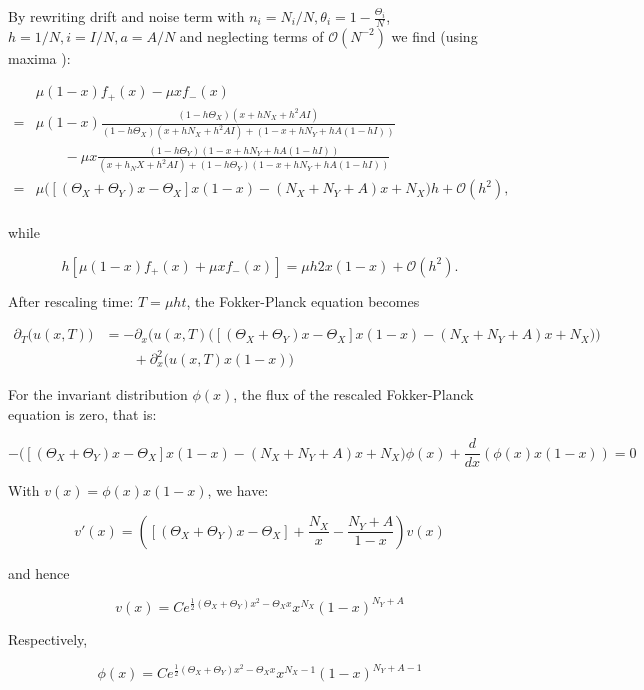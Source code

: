 By rewriting drift and noise term with $n_i = N_i/N, \theta_i = 1- \frac{\Theta_i}{N}$, $h = 1/N, i= I/N, a = A/N$ and neglecting terms of $\mathcal{O}(N^{-2})$ we find (using maxima %
):

\begin{align*}
& \mu(1-x)f_+(x) - \mu xf_-(x)\\
= & \mu(1-x) \frac{(1-h\Theta_X) (x+ hN_X+ h^2AI)}{(1-h\Theta_X) (x + hN_X + h^2AI) + (1-x + hN_Y + hA(1-hI))}\\
&\qquad - \mu x \frac{(1-h\Theta_Y)(1-x+hN_Y+hA(1-hI))}{(x+h_NX+h^2AI) + (1-h\Theta_Y)(1-x+hN_Y+hA(1-hI))}\\
=& \mu\Big(\left[\left(\Theta_X + \Theta_Y\right)x - \Theta_X\right]x\left(1-x\right)-\left(N_X + N_Y + A\right)x + N_X\Big)h+ \mathcal{O}(h^2),\\
\end{align*}

while 

\begin{equation*}
h\left[\mu(1-x)f_+(x) + \mu xf_-(x)\right] = \mu h 2x(1-x) + \mathcal{O}(h^2).
\end{equation*}

After rescaling time: $T = \mu h t$, the Fokker-Planck equation becomes

\begin{align*}
\partial_T \big(u\left(x, T\right)\big) &= -\partial_x\Bigg(u(x,T)\Big(\left[\left(\Theta_X + \Theta_Y\right)x - \Theta_X\right]x\left(1-x\right)-\left(N_X + N_Y + A\right)x + N_X\Big)\Bigg)\\
&\qquad + \partial^2_x\big(u(x,T)x(1-x)\big)
\end{align*}

For the invariant distribution $\phi(x)$, the flux of the rescaled Fokker-Planck equation is zero, that is:

\begin{equation*}
-\Big(\left[\left(\Theta_X + \Theta_Y\right)x - \Theta_X\right]x\left(1-x\right)-\left(N_X + N_Y + A\right)x + N_X\Big)\phi(x) + \frac{d}{dx}\left(\phi(x)x\left(1-x\right)\right)= 0
\end{equation*}

With $v(x) = \phi(x)x\left(1-x\right)$, we have:

\begin{equation*}
v'(x) = \left(\left[\left(\Theta_X + \Theta_Y\right)x - \Theta_X\right] + \frac{N_X}{x} - \frac{N_Y + A}{1-x}\right)v(x)
\end{equation*}

and hence

\begin{equation*}
v(x) = Ce^{\frac{1}{2}\left(\Theta_X + \Theta_Y\right)x^2 - \Theta_X x}x^{N_X}\left(1-x\right)^{N_Y+A}
\end{equation*}

Respectively,

\begin{equation*}
\phi(x) = Ce^{\frac{1}{2}\left(\Theta_X + \Theta_Y\right)x^2 - \Theta_X x}x^{N_X - 1}\left(1-x\right)^{N_Y+A - 1}
\end{equation*}
